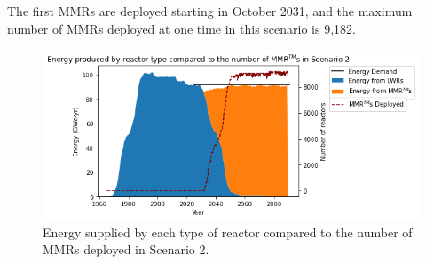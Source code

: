 The first \glspl{MMR} are deployed starting in October 2031, and the 
maximum number of \glspl{MMR} deployed at one time in this scenario is 
9,182. 

\begin{figure}
    \centering 
    \includegraphics[scale=0.5]{figures/energy_scenario2.png}
    \caption{Energy supplied by each type of reactor compared to the number of 
    \glspl{MMR} deployed in Scenario 2.}
    \label{fig:energy_rx_2}
\end{figure}



